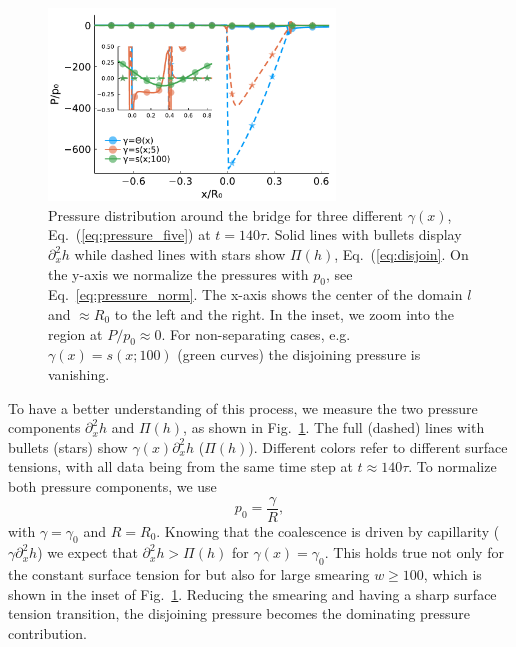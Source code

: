 \begin{figure}
    \centering
    \includegraphics[width=0.68\textwidth]{graphics/pressures_three_gam_end.pdf}
    \caption{Pressure distribution around the bridge for three different $\gamma(x)$, Eq.~(\ref{eq:pressure_five}) at $t=140\tau$.
    Solid lines with bullets display $\partial_x^2 h$ while dashed lines with stars show $\Pi(h)$, Eq.~(\ref{eq:disjoin}.
    On the y-axis we normalize the pressures with $p_0$, see Eq.~\ref{eq:pressure_norm}.
    The x-axis shows the center of the domain $l$ and $\approx R_0$ to the left and the right.
    In the inset, we zoom into the region at $P/p_0 \approx 0$. 
    For non-separating cases, e.g. $\gamma(x) = s(x;100)$ (green curves) the disjoining pressure is vanishing.}
    \label{fig:pressures}
\end{figure}
To have a better understanding of this process, we measure the two pressure components $\partial_x^2 h$ and $\Pi(h)$, as shown in Fig.~\ref{fig:pressures}.
The full (dashed) lines with bullets (stars) show $\gamma(x)\partial_x^2 h$ ($\Pi(h)$). 
Different colors refer to different surface tensions, with all data being from the same time step at $t\approx 140\tau$.
To normalize both pressure components, we use 
\begin{equation}\label{eq:pressure_norm}
    p_0 = \frac{\gamma}{R},
\end{equation}
with $\gamma = \gamma_0$ and $R = R_0$.
Knowing that the coalescence is driven by capillarity ($\gamma\partial_x^2 h$) we expect that $\partial_x^2 h > \Pi(h)$ for $\gamma(x) = \gamma_0$.
This holds true not only for the constant surface tension for but also for large smearing $w\ge 100$, which is shown in the inset of Fig.~\ref{fig:pressures}.
Reducing the smearing and having a sharp surface tension transition, the disjoining pressure becomes the dominating pressure contribution.
